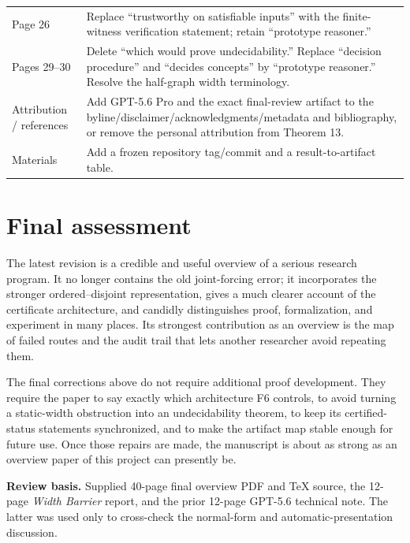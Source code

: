 \documentclass[11pt]{article}
\begin{document}
\begin{longtable}{@{}p{}p{}@{}}
Page 26 & Replace ``trustworthy on satisfiable inputs'' with the finite-witness verification statement; retain ``prototype reasoner.'' \\
Pages 29--30 & Delete ``which would prove undecidability.'' Replace ``decision procedure'' and ``decides concepts'' by ``prototype reasoner.'' Resolve the half-graph width terminology. \\
Attribution / references & Add GPT-5.6 Pro and the exact final-review artifact to the byline/disclaimer/acknowledgments/metadata and bibliography, or remove the personal attribution from Theorem 13. \\
Materials & Add a frozen repository tag/commit and a result-to-artifact table. \\
\bottomrule
\end{longtable}

\section{Final assessment}

The latest revision is a credible and useful overview of a serious research program. It no longer contains the old joint-forcing error; it incorporates the stronger ordered--disjoint representation, gives a much clearer account of the certificate architecture, and candidly distinguishes proof, formalization, and experiment in many places. Its strongest contribution as an overview is the map of failed routes and the audit trail that lets another researcher avoid repeating them.

The final corrections above do not require additional proof development. They require the paper to say exactly which architecture F6 controls, to avoid turning a static-width obstruction into an undecidability theorem, to keep its certified-status statements synchronized, and to make the artifact map stable enough for future use. Once those repairs are made, the manuscript is about as strong as an overview paper of this project can presently be.

\smallskip
\noindent\textbf{Review basis.} Supplied 40-page final overview PDF and \TeX{} source, the 12-page \emph{Width Barrier} report, and the prior 12-page GPT-5.6 technical note. The latter was used only to cross-check the normal-form and automatic-presentation discussion.
\end{document}
